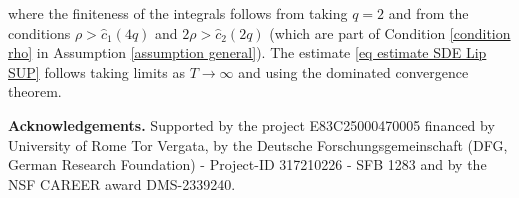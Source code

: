 \documentclass[11pt]{amsart}
\theoremstyle{plain}
\numberwithin{equation}{section}
\begin{document}
where the finiteness of the integrals follows from taking $q=2$ and from the conditions $\rho > \hat c _1(4q)$ and $2 \rho > \hat c _2 (2q)$ (which are part of Condition \ref{condition rho} in Assumption \ref{assumption general}).
The estimate \eqref{eq estimate SDE Lip SUP} follows taking limits as $T \to  \infty$ and using the dominated convergence theorem.

\vspace{10pt}

\noindent \textbf{Acknowledgements.} 
Supported by 
the project E83C25000470005 financed by University of Rome Tor Vergata, by the Deutsche Forschungsgemeinschaft (DFG, German Research Foundation) - Project-ID 317210226 - SFB 1283 and by the NSF CAREER award DMS-2339240.





\newpage
\end{document}
